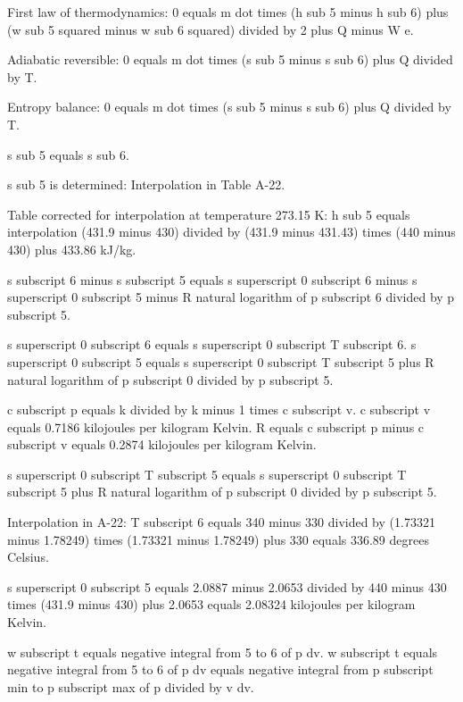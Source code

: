 First law of thermodynamics:  
0 equals m dot times (h sub 5 minus h sub 6) plus (w sub 5 squared minus w sub 6 squared) divided by 2 plus Q minus W e.  

Adiabatic reversible:  
0 equals m dot times (s sub 5 minus s sub 6) plus Q divided by T.  

Entropy balance:  
0 equals m dot times (s sub 5 minus s sub 6) plus Q divided by T.  

s sub 5 equals s sub 6.  

s sub 5 is determined:  
Interpolation in Table A-22.  

Table corrected for interpolation at temperature 273.15 K:  
h sub 5 equals interpolation (431.9 minus 430) divided by (431.9 minus 431.43) times (440 minus 430) plus 433.86 kJ/kg.

s subscript 6 minus s subscript 5 equals s superscript 0 subscript 6 minus s superscript 0 subscript 5 minus R natural logarithm of p subscript 6 divided by p subscript 5.  

s superscript 0 subscript 6 equals s superscript 0 subscript T subscript 6.  
s superscript 0 subscript 5 equals s superscript 0 subscript T subscript 5 plus R natural logarithm of p subscript 0 divided by p subscript 5.  

c subscript p equals k divided by k minus 1 times c subscript v.  
c subscript v equals 0.7186 kilojoules per kilogram Kelvin.  
R equals c subscript p minus c subscript v equals 0.2874 kilojoules per kilogram Kelvin.  

s superscript 0 subscript T subscript 5 equals s superscript 0 subscript T subscript 5 plus R natural logarithm of p subscript 0 divided by p subscript 5.  

Interpolation in A-22:  
T subscript 6 equals 340 minus 330 divided by (1.73321 minus 1.78249) times (1.73321 minus 1.78249) plus 330 equals 336.89 degrees Celsius.  

s superscript 0 subscript 5 equals 2.0887 minus 2.0653 divided by 440 minus 430 times (431.9 minus 430) plus 2.0653 equals 2.08324 kilojoules per kilogram Kelvin.  

w subscript t equals negative integral from 5 to 6 of p dv.  
w subscript t equals negative integral from 5 to 6 of p dv equals negative integral from p subscript min to p subscript max of p divided by v dv.